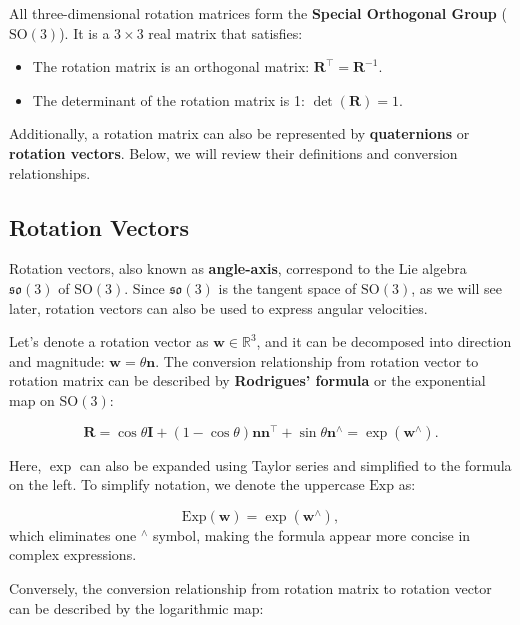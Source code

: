 All three-dimensional rotation matrices form the \textbf{Special Orthogonal Group} ($\mathrm{SO}(3)$). It is a $3 \times 3$ real matrix that satisfies:
\begin{itemize}
	\item The rotation matrix is an orthogonal matrix: $\mathbf{R}^\top = \mathbf{R}^{-1}$.
	\item The determinant of the rotation matrix is 1: $\det(\mathbf{R}) = 1$.
\end{itemize}

Additionally, a rotation matrix can also be represented by \textbf{quaternions} or \textbf{rotation vectors}. Below, we will review their definitions and conversion relationships.

\subsection{Rotation Vectors}
Rotation vectors, also known as \textbf{angle-axis}, correspond to the Lie algebra $\mathfrak{so}(3)$ of $\mathrm{SO}(3)$. Since $\mathfrak{so}(3)$ is the tangent space of $\mathrm{SO}(3)$, as we will see later, rotation vectors can also be used to express angular velocities.

Let's denote a rotation vector as $\mathbf{w} \in \mathbb{R}^3$, and it can be decomposed into direction and magnitude: $\mathbf{w}=\theta \mathbf{n}$. The conversion relationship from rotation vector to rotation matrix can be described by \textbf{Rodrigues' formula} or the exponential map on $\mathrm{SO}(3)$:

\begin{equation}
	\label{eq:rogridues}
	\mathbf{R} = \cos \theta \mathbf{I} + \left( {1 - \cos \theta } \right) \mathbf{n}{\mathbf{n}^\top} + \sin \theta 
	{ \mathbf{n}^ \wedge } = \exp(\mathbf{w}^\wedge).
\end{equation}

Here, $\exp$ can also be expanded using Taylor series and simplified to the formula on the left. To simplify notation, we denote the uppercase $\mathrm{Exp}$ as:

\begin{equation}
	\mathrm{Exp}(\mathbf{w}) = \exp(\mathbf{w}^\wedge),
\end{equation}
which eliminates one $^\wedge$ symbol, making the formula appear more concise in complex expressions.

Conversely, the conversion relationship from rotation matrix to rotation vector can be described by the logarithmic map:

